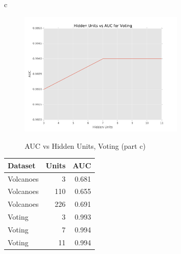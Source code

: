 \documentclass[fleqn]{homework}
\begin{document}
\begin{problem}{c}
    \begin{figure}
      \centering
      \caption{AUC vs Hidden Units, Voting (part c)}
      \includegraphics[width=0.7\textwidth]{partc-voting.pdf}
      \label{fig:part-c-voting}
    \end{figure}

    \begin{tabular}{|lrr|}
      \hline
      Dataset & Units & AUC \\
      \hline
      Volcanoes & 3 & 0.681 \\
      Volcanoes & 110 & 0.655 \\
      Volcanoes & 226 & 0.691 \\
      Voting & 3 & 0.993 \\
      Voting & 7 & 0.994 \\
      Voting & 11 & 0.994 \\
      \hline
    \end{tabular}

  \end{problem}
\end{document}
